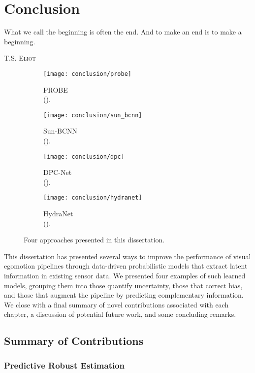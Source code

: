 \chapter{Conclusion}
\epigraph{What we call the beginning is often the end. And to make an end is to make a beginning.}{\textsc{T.S. Eliot}}
\begin{figure}
\begin{subfigure}[]{0.24\textwidth}
    \texttt{[image: conclusion/probe]}
  \caption{PROBE \\ ().}
\end{subfigure}
\begin{subfigure}[]{0.24\textwidth}
    \texttt{[image: conclusion/sun\_bcnn]}
  \caption{Sun-BCNN \\ ().}
\end{subfigure}
\begin{subfigure}[]{0.24\textwidth}
    \texttt{[image: conclusion/dpc]}
  \caption{DPC-Net \\ ().}
\end{subfigure}
\begin{subfigure}[]{0.22\textwidth}
    \texttt{[image: conclusion/hydranet]}
  \caption{HydraNet \\ ().}
\end{subfigure}
\caption{Four approaches presented in this dissertation.}
\end{figure}

This dissertation has presented several ways to improve the performance of visual egomotion pipelines through data-driven probabilistic models that extract latent information in existing sensor data.  We presented four examples of such learned models, grouping them into those quantify uncertainty, those that correct bias, and those that augment the pipeline by predicting complementary information. We close with a final summary of novel contributions associated with each chapter, a discussion of potential future work, and some concluding remarks.

\section{Summary of Contributions}

\subsection{Predictive Robust Estimation}

